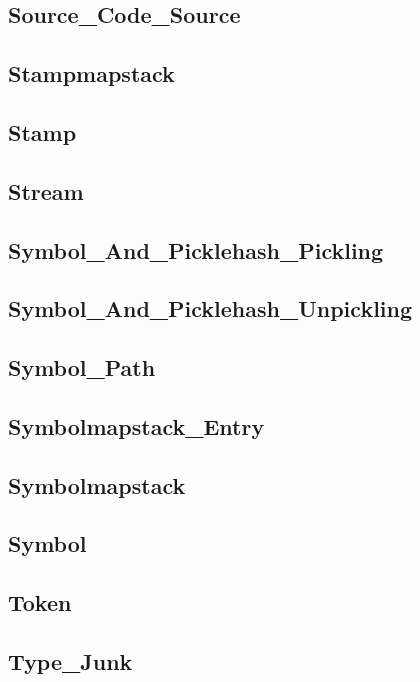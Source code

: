\subsection{Source\_Code\_Source}			
\subsection{Stampmapstack}				
\subsection{Stamp}					
\subsection{Stream}					
\subsection{Symbol\_And\_Picklehash\_Pickling}		
\subsection{Symbol\_And\_Picklehash\_Unpickling}	
\subsection{Symbol\_Path}				
\subsection{Symbolmapstack\_Entry}			
\subsection{Symbolmapstack}				
\subsection{Symbol}					
\subsection{Token}					
\subsection{Type\_Junk}					
